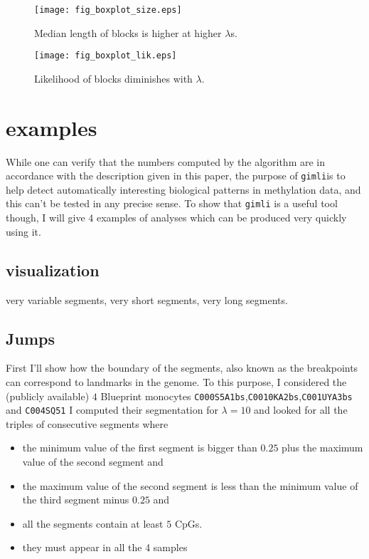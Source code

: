 \documentclass[12pt]{amsart}
\newcommand{\gimli}{\texttt{gimli}}
\begin{document}
\begin{figure}\label{fig4}
\texttt{[image: fig\_boxplot\_size.eps]}
\caption{Median length of blocks is higher at higher $\lambda$s.}
\end{figure}

\begin{figure}\label{fig5}
\texttt{[image: fig\_boxplot\_lik.eps]}
\caption{Likelihood of blocks diminishes with $\lambda$.}
\end{figure}

\section{examples}

While one can verify that the numbers computed by the algorithm are in 
accordance with the description
given in this paper, the purpose of \gimli is to help 
detect automatically interesting
biological patterns in methylation data, and this can't be tested in any 
precise sense. To show that \gimli{} is a useful tool
though, I will give $4$ examples of analyses which can be produced very quickly
using it. 

\subsection{visualization}

very variable segments, very short segments, very long segments.


\subsection{Jumps}

First I'll show how the boundary of the segments, also known as the breakpoints
can correspond to landmarks in the genome. To this purpose, I considered the (publicly available)
$4$ Blueprint monocytes \verb=C000S5A1bs=,\verb=C0010KA2bs=,\verb=C001UYA3bs= and \verb=C004SQ51= 
I computed their segmentation for $\lambda=10$ and looked for all the triples of consecutive segments
where 
\begin{itemize}
\item{} the minimum value of the first segment is bigger than $0.25$ plus the maximum value
of the second segment and
\item{} the maximum value of the second segment is less than the minimum value of the third
segment minus $0.25$ and
\item{} all the segments contain at least $5$ CpGs.
\item{} they must appear in all the 4 samples
\end{itemize}
\end{document}
